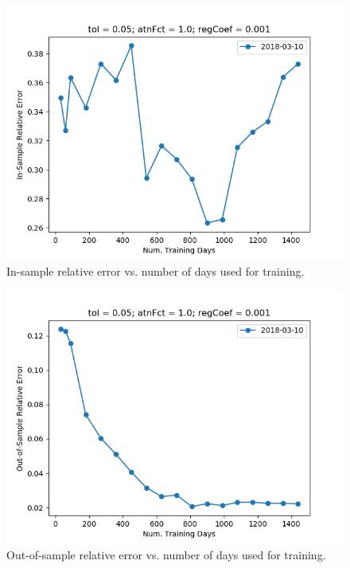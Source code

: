 \documentclass{article}
\begin{document}
\begin{figure}\label{fig:nTrnDays-sensitivity-error}
\includegraphics[bb=0 0 640 480]{figures/nTrnDays-sensitivity-error.png}
\caption{In-sample relative error vs. number of days used for training.}
\end{figure}

\begin{figure}\label{fig:nTrnDays-sensitivity-oos-error}
\includegraphics[bb=0 0 640 480]{figures/nTrnDays-sensitivity-oos-error.png}
\caption{Out-of-sample relative error vs. number of days used for training.}
\end{figure}
\end{document}
